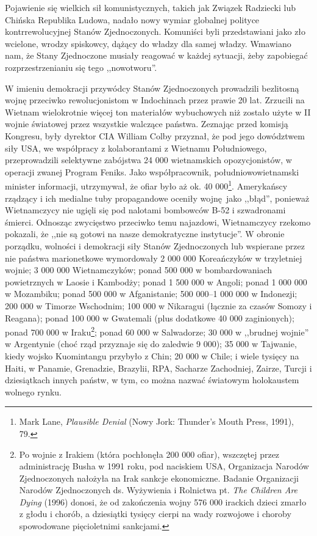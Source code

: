 \documentclass[12pt]{book}
\begin{document}
Pojawienie się wielkich sił komunistycznych, takich jak Związek Radziecki lub Chińska Republika Ludowa, nadało nowy wymiar globalnej polityce kontrrewolucyjnej Stanów Zjednoczonych. Komuniści byli przedstawiani jako zło wcielone, wrodzy spiskowcy, dążący do władzy dla samej władzy. Wmawiano nam, że Stany Zjednoczone musiały reagować w każdej sytuacji, żeby zapobiegać rozprzestrzenianiu się tego ,,nowotworu''.

W imieniu demokracji przywódcy Stanów Zjednoczonych prowadzili bezlitosną wojnę przeciwko rewolucjonistom w Indochinach przez prawie 20 lat. Zrzucili na Wietnam wielokrotnie więcej ton materiałów wybuchowych niż zostało użyte w II wojnie światowej przez wszystkie walczące państwa. Zeznając przed komisją Kongresu, były dyrektor CIA William Colby przyznał, że pod jego dowództwem siły USA, we współpracy z kolaborantami z Wietnamu Południowego, przeprowadzili selektywne zabójstwa 24 000 wietnamskich opozycjonistów, w operacji zwanej Program Feniks. Jako współpracownik, południowowietnamski minister informacji, utrzymywał, że ofiar było aż ok. 40 000\footnote{Mark Lane, \textit{Plausible Denial} (Nowy Jork: Thunder's Mouth Press, 1991), 79.}. Amerykańscy rządzący i ich medialne tuby propagandowe oceniły wojnę jako ,,błąd'', ponieważ Wietnamczycy nie ugięli się pod nalotami bombowców B-52 i szwadronami śmierci. Odnosząc zwycięstwo przeciwko temu najazdowi, Wietnamczycy rzekomo pokazali, że ,,nie są gotowi na nasze demokratyczne instytucje''. W obronie porządku, wolności i demokracji siły Stanów Zjednoczonych lub wspierane przez nie państwa marionetkowe wymordowały 2 000 000 Koreańczyków w trzyletniej wojnie; 3 000 000 Wietnamczyków; ponad 500 000 w bombardowaniach powietrznych w Laosie i Kambodży; ponad 1 500 000 w Angoli; ponad 1 000 000 w Mozambiku; ponad 500 000 w Afganistanie; 500 000–1 000 000 w Indonezji; 200 000 w Timorze Wschodnim; 100 000 w Nikaragui (łącznie za czasów Somozy i Reagana); ponad 100 000 w Gwatemali (plus dodatkowe 40 000 zaginionych); ponad 700 000 w Iraku\footnote{Po wojnie z Irakiem (która pochłonęła 200 000 ofiar), wszczętej przez administrację Busha w 1991 roku, pod naciskiem USA, Organizacja Narodów Zjednoczonych nałożyła na Irak sankcje ekonomiczne. Badanie Organizacji Narodów Zjednoczonych ds. Wyżywienia i Rolnictwa pt. \textit{The Children Are Dying} (1996) donosi, że od zakończenia wojny 576 000 irackich dzieci zmarło z głodu i chorób, a dziesiątki tysięcy cierpi na wady rozwojowe i choroby spowodowane pięcioletnimi sankcjami.}; ponad 60 000 w Salwadorze; 30 000 w ,,brudnej wojnie'' w Argentynie (choć rząd przyznaje się do zaledwie 9 000); 35 000 w Tajwanie, kiedy wojsko Kuomintangu przybyło z Chin; 20 000 w Chile; i wiele tysięcy na Haiti, w Panamie, Grenadzie, Brazylii, RPA, Sacharze Zachodniej, Zairze, Turcji i dziesiątkach innych państw, w tym, co można nazwać światowym holokaustem wolnego rynku.
\end{document}
